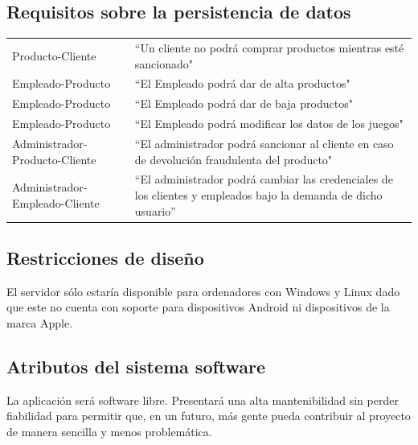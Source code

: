 \subsection{Requisitos sobre la persistencia de datos}
\label{sec:req_pers_dat}
\noindent\begin{tabularx}{\textwidth}{ l X }
    Producto-Cliente               & ``Un cliente no podrá comprar productos mientras esté sancionado"                                                \\
    Empleado-Producto              & ``El Empleado podrá dar de alta productos"                                                                       \\
    Empleado-Producto              & ``El Empleado podrá dar de baja productos"                                                                       \\
    Empleado-Producto              & ``El Empleado podrá modificar los datos de los juegos"                                                           \\
    Administrador-Producto-Cliente & ``El administrador podrá sancionar al cliente en caso de devolución fraudulenta del producto"                    \\
    Administrador-Empleado-Cliente & ``El administrador podrá cambiar las credenciales de los clientes y empleados bajo la demanda de dicho usuario'' \\
\end{tabularx}
\subsection{Restricciones de diseño}
El servidor sólo estaría disponible para ordenadores con Windows y Linux dado que este no cuenta con soporte para dispositivos Android ni dispositivos de la marca Apple.
\subsection{Atributos del sistema software}
La aplicación será software libre. Presentará una alta mantenibilidad sin perder fiabilidad para permitir que, en un futuro, más gente pueda contribuir al proyecto de manera sencilla y menos problemática.
